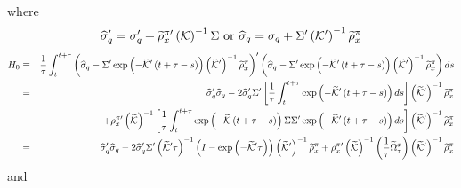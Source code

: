 \documentclass{article}
\begin{document}
where%
\begin{equation*}
\widehat{\sigma }_{q}^{\prime }=\sigma _{q}^{\prime }+\widetilde{\rho }%
_{x}^{\pi \prime }\left( \mathcal{K}\right) ^{-1}\Sigma \text{ or }\widehat{%
\sigma }_{q}=\sigma _{q}+\Sigma ^{\prime }\left( \mathcal{K}^{\prime
}\right) ^{-1}\widetilde{\rho }_{x}^{\pi }
\end{equation*}
\begin{eqnarray*}
H_{0} &\equiv &\frac{1}{\tau }\int_{t}^{t+\tau }\left( \widehat{\sigma }%
_{q}-\Sigma ^{\prime }\exp \left( -\widetilde{\mathcal{K}}^{\prime }\left(
t+\tau -s\right) \right) \left( \widetilde{\mathcal{K}}^{\prime }\right)
^{-1}\widetilde{\rho }_{x}^{\pi }\right) ^{\prime }\left( \widehat{\sigma }%
_{q}-\Sigma ^{\prime }\exp \left( -\widetilde{\mathcal{K}}^{\prime }\left(
t+\tau -s\right) \right) \left( \widetilde{\mathcal{K}}^{\prime }\right)
^{-1}\widetilde{\rho }_{x}^{\pi }\right) ds \\
&=&\widehat{\sigma }_{q}^{\prime }\widehat{\sigma }_{q}-2\widehat{\sigma }%
_{q}^{\prime }\Sigma ^{\prime }\left[ \frac{1}{\tau }\int_{t}^{t+\tau }\exp
\left( -\widetilde{\mathcal{K}}^{\prime }\left( t+\tau -s\right) \right) ds%
\right] \left( \widetilde{\mathcal{K}}^{\prime }\right) ^{-1}\widetilde{\rho 
}_{x}^{\pi } \\
&&+\rho _{x}^{\pi \prime }\left( \widetilde{\mathcal{K}}\right) ^{-1}\left[ 
\frac{1}{\tau }\int_{t}^{t+\tau }\exp \left( -\widetilde{\mathcal{K}}\left(
t+\tau -s\right) \right) \Sigma \Sigma ^{\prime }\exp \left( -\widetilde{%
\mathcal{K}}^{\prime }\left( t+\tau -s\right) \right) ds\right] \left( 
\widetilde{\mathcal{K}}^{\prime }\right) ^{-1}\widetilde{\rho }_{x}^{\pi } \\
&=&\widehat{\sigma }_{q}^{\prime }\widehat{\sigma }_{q}-2\widehat{\sigma }%
_{q}^{\prime }\Sigma ^{\prime }\left( \widetilde{\mathcal{K}}^{\prime }\tau
\right) ^{-1}\left( I-\exp \left( -\widetilde{\mathcal{K}}^{\prime }\tau
\right) \right) \left( \widetilde{\mathcal{K}}^{\prime }\right) ^{-1}%
\widetilde{\rho }_{x}^{\pi }+\rho _{x}^{\pi \prime }\left( \widetilde{%
\mathcal{K}}\right) ^{-1}\left( \frac{1}{\tau }\widetilde{\Omega }_{\tau
}^{x}\right) \left( \widetilde{\mathcal{K}}^{\prime }\right) ^{-1}\widetilde{%
\rho }_{x}^{\pi }
\end{eqnarray*}%
and%
\end{document}
